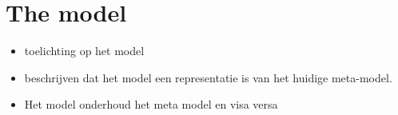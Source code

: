\section{The model} \label{sec:artifact_model}

\begin{itemize}
    \item toelichting op het model
    \item beschrijven dat het model een representatie is van het
    huidige meta-model.
    \item Het model onderhoud het meta model en visa versa
\end{itemize}